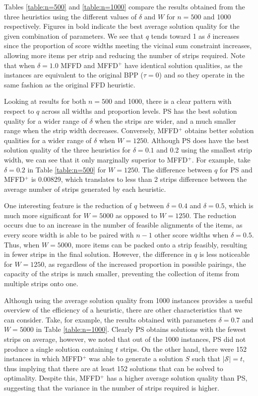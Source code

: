 \documentclass[runningheads]{llncs}
\begin{document}
Tables \ref{table:n=500} and \ref{table:n=1000} compare the results obtained from the three heuristics using the different values of $\delta$ and $W$ for $n = 500$ and 1000 respectively. Figures in bold indicate the best average solution quality for the given combination of parameters. We see that $q$ tends toward 1 as $\delta$ increases since the proportion of score widths meeting the vicinal sum constraint increases, allowing more items per strip and reducing the number of strips required. Note that when $\delta = 1.0$ MFFD and MFFD$^+$ have identical solution qualities, as the instances are equivalent to the original BPP ($\tau = 0$) and so they operate in the same fashion as the original FFD heuristic.

Looking at results for both $n = 500$ and 1000, there is a clear pattern with respect to $q$ across all widths and proportion levels. PS has the best solution quality for a wider range of $\delta$ when the strips are wider, and a much smaller range when the strip width decreases. Conversely, MFFD$^+$ obtains better solution qualities for a wider range of $\delta$ when $W = 1250$. Although PS does have the best solution quality of the three heuristics for $\delta = 0.1$ and 0.2 using the smallest strip width, we can see that it only marginally superior to MFFD$^+$. For example, take $\delta = 0.2$ in Table \ref{table:n=500} for $W = 1250$. The difference between $q$ for PS and MFFD$^+$ is 0.00829, which translates to less than 2 strips difference between the average number of strips generated by each heuristic.

One interesting feature is the reduction of $q$ between $\delta = 0.4$ and $\delta = 0.5$, which is much more significant for $W = 5000$ as opposed to $W = 1250$. The reduction occurs due to an increase in the number of feasible alignments of the items, as every score width is able to be paired with $n-1$ other score widths when $\delta = 0.5$. Thus, when $W = 5000$, more items can be packed onto a strip feasibly, resulting in fewer strips in the final solution. However, the difference in $q$ is less noticeable for $W = 1250$, as regardless of the increased proportion in possible pairings, the capacity of the strips is much smaller, preventing the collection of items from multiple strips onto one.

Although using the average solution quality from 1000 instances provides a useful overview of the efficiency of a heuristic, there are other characteristics that we can consider. Take, for example, the results obtained with parameters $\delta = 0.7$ and $W = 5000$ in Table \ref{table:n=1000}. Clearly PS obtains solutions with the fewest strips on average, however, we noted that out of the 1000 instances, PS did not produce a single solution containing $t$ strips. On the other hand, there were 152 instances in which MFFD$^+$ was able to generate a solution $S$ such that $|\mathcal{S}| = t$, thus implying that there are at least 152 solutions that can be solved to optimality. Despite this, MFFD$^+$ has a higher average solution quality than PS, suggesting that the variance in the number of strips required is higher.
\end{document}
